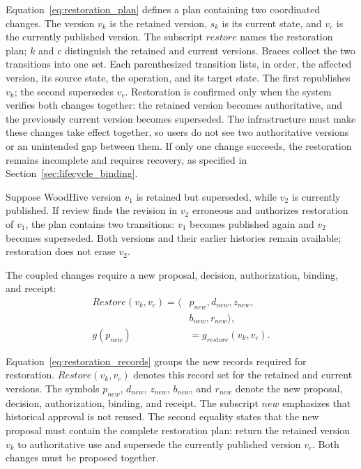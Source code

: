 \documentclass[journal]{IEEEtran}
\begin{document}
Equation~\ref{eq:restoration_plan} defines a plan containing two
coordinated changes. The version $v_k$ is the retained version,
$s_k$ is its current state, and $v_c$ is the currently published
version. The subscript $restore$ names the restoration plan;
$k$ and $c$ distinguish the retained and current versions.
Braces collect the two transitions into one set. Each parenthesized
transition lists, in order, the affected version, its source state,
the operation, and its target state. The first republishes $v_k$;
the second supersedes $v_c$. Restoration is confirmed only when the system verifies both
changes together: the retained version becomes authoritative,
and the previously current version becomes superseded.
The infrastructure must make these changes take effect
together, so users do not see two authoritative versions
or an unintended gap between them. If only one change
succeeds, the restoration remains incomplete and requires
recovery, as specified in Section~\ref{sec:lifecycle_binding}.

Suppose WoodHive version $v_1$ is retained but superseded, while
$v_2$ is currently published. If review finds the revision in
$v_2$ erroneous and authorizes restoration of $v_1$, the plan
contains two transitions: $v_1$ becomes published again and
$v_2$ becomes superseded. Both versions and their earlier
histories remain available; restoration does not erase $v_2$.

The coupled changes require a new proposal, decision,
authorization, binding, and receipt:
\begin{equation}
\label{eq:restoration_records}
\begin{aligned}
Restore(v_k,v_c)=\langle&
p_{new},d_{new},z_{new},\\
&b_{new},r_{new}\rangle,\\
g(p_{new})&=g_{restore}(v_k,v_c).
\end{aligned}
\end{equation}

Equation~\ref{eq:restoration_records} groups the new records
required for restoration. $Restore(v_k,v_c)$ denotes this record
set for the retained and current versions. The symbols $p_{new}$,
$d_{new}$, $z_{new}$, $b_{new}$, and $r_{new}$ denote the new
proposal, decision, authorization, binding, and receipt.
The subscript $new$ emphasizes that historical approval is not
reused. The second equality states that the new proposal must contain
the complete restoration plan: return the retained version
$v_k$ to authoritative use and supersede the currently
published version $v_c$. Both changes must be proposed
together.
\end{document}
